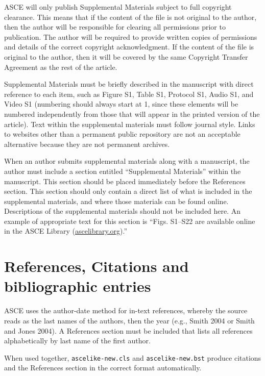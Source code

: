 \documentclass[
  NewProceedings,
  letterpaper]{./assets/ascelike-new}
\begin{document}
ASCE will only publish Supplemental Materials subject to full copyright
clearance. This means that if the content of the file is not original to
the author, then the author will be responsible for clearing all
permissions prior to publication. The author will be required to provide
written copies of permissions and details of the correct copyright
acknowledgment. If the content of the file is original to the author,
then it will be covered by the same Copyright Transfer Agreement as the
rest of the article.

Supplemental Materials must be briefly described in the manuscript with
direct reference to each item, such as Figure S1, Table S1, Protocol S1,
Audio S1, and Video S1 (numbering should always start at 1, since these
elements will be numbered independently from those that will appear in
the printed version of the article). Text within the supplemental
materials must follow journal style. Links to websites other than a
permanent public repository are not an acceptable alternative because
they are not permanent archives.

When an author submits supplemental materials along with a manuscript,
the author must include a section entitled ``Supplemental Materials''
within the manuscript. This section should be placed immediately before
the References section. This section should only contain a direct list
of what is included in the supplemental materials, and where those
materials can be found online. Descriptions of the supplemental
materials should not be included here. An example of appropriate text
for this section is ``Figs. S1--S22 are available online in the ASCE
Library (\href{http://ascelibrary.org/}{ascelibrary.org}).''

\hypertarget{references-citations-and-bibliographic-entries}{%
\section{References, Citations and bibliographic
entries}\label{references-citations-and-bibliographic-entries}}

ASCE uses the author-date method for in-text references, whereby the
source reads as the last names of the authors, then the year (e.g.,
Smith 2004 or Smith and Jones 2004). A References section must be
included that lists all references alphabetically by last name of the
first author.

When used together, \texttt{ascelike-new.cls} and
\texttt{ascelike-new.bst} produce citations and the References section
in the correct format automatically.
\end{document}
